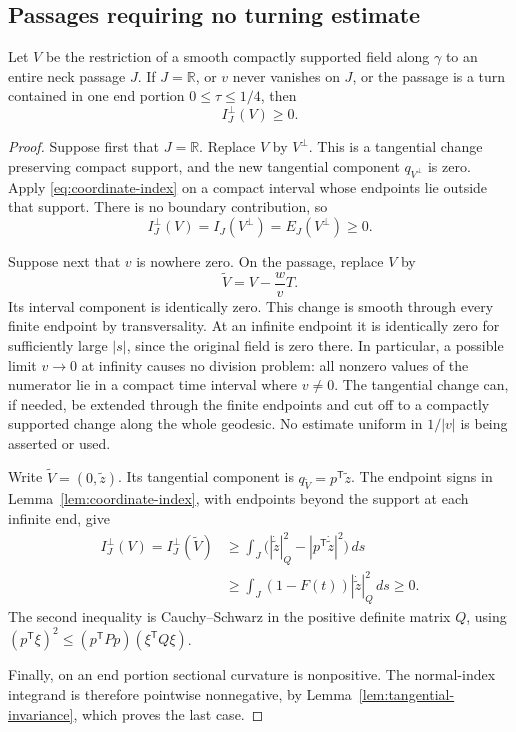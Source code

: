 \subsection{Passages requiring no turning estimate}

\begin{lemma}\label{lem:elementary-passages}
Let $V$ be the restriction of a smooth compactly supported field along
$\gamma$ to an entire neck passage $J$.  If $J=\mathbb R$, or $v$ never
vanishes on $J$, or the passage is a turn contained in one end portion
$0\le\tau\le1/4$, then
\[
 I_J^\perp(V)\ge0.
\]
\end{lemma}

\begin{proof}
Suppose first that $J=\mathbb R$.  Replace $V$ by $V^\perp$.
This is a tangential change preserving compact support, and the new
tangential component $q_{V^\perp}$ is zero.  Apply
\eqref{eq:coordinate-index} on a compact interval whose endpoints lie
outside that support.  There is no boundary contribution, so
\[
 I_J^\perp(V)=I_J(V^\perp)=E_J(V^\perp)\ge0.
\]

Suppose next that $v$ is nowhere zero.  On the passage, replace $V$ by
\[
 \widetilde V=V-\frac{w}{v}T.
\]
Its interval component is identically zero.  This change is smooth
through every finite endpoint by transversality.  At an infinite
endpoint it is identically zero for sufficiently large $|s|$, since
the original field is zero there.  In particular, a possible limit
$v\to0$ at infinity causes no division problem: all nonzero values of
the numerator lie in a compact time interval where $v\ne0$.
The tangential change can, if needed, be extended through the finite
endpoints and cut off to a compactly supported change along the whole
geodesic.  No estimate uniform in $1/|v|$ is being asserted or used.

Write $\widetilde V=(0,\widetilde z)$.  Its tangential component is
$q_{\widetilde V}=p^{\mathsf T}\widetilde z$.  The endpoint signs in
Lemma~\ref{lem:coordinate-index}, with endpoints beyond the support
at each infinite end, give
\begin{align*}
 I_J^\perp(V)=I_J^\perp(\widetilde V)
 &\ge\int_J\bigl(|\dot{\widetilde z}|_Q^2
                    -|p^{\mathsf T}\dot{\widetilde z}|^2\bigr)\,ds\\
 &\ge\int_J(1-F(t))|\dot{\widetilde z}|_Q^2\,ds\ge0.
\end{align*}
The second inequality is Cauchy--Schwarz in the positive definite
matrix $Q$, using
$(p^{\mathsf T}\xi)^2\le(p^{\mathsf T}Pp)(\xi^{\mathsf T}Q\xi)$.

Finally, on an end portion sectional curvature is nonpositive.  The
normal-index integrand is therefore pointwise nonnegative, by
Lemma~\ref{lem:tangential-invariance}, which proves the last case.
\end{proof}

